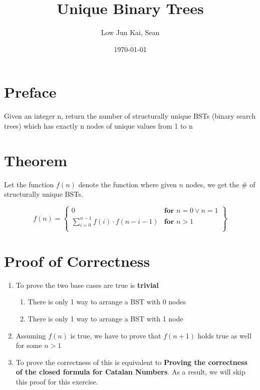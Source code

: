 \documentclass{article}
\title{Unique Binary Trees}
\author{Low Jun Kai, Sean}
\date\today
\begin{document}
\maketitle %

\section*{Preface}

Given an integer n, return the number of structurally unique BSTs (binary search trees) which has exactly n nodes of unique values from 1 to n

\section*{Theorem} 

Let the function $f(n)$ denote the function where given $n$ nodes, we get the \# of structurally unique BSTs. 

\[
    f(n) =
    \left \{
    \begin{array}{lr}
      0 & \textbf{for } n = 0 \lor n = 1 \\
      \sum^{n-1}_{i=0} f(i) \cdot f(n - i -1) & \textbf{for } n > 1 \\ 
    \end{array}
     \right \}
\]

\section*{Proof of Correctness}

\begin{enumerate}

\item To prove the two base cases are true is \textbf{trivial}

\begin{enumerate}

\item There is only 1 way to arrange a BST with 0 nodes

\item There is only 1 way to arrange a BST with 1 node

\end{enumerate}

\item Assuming $f(n)$ is true, we have to prove that $f(n+1)$ holds true as well for some $n > 1$

\item To prove the correctness of this is equivalent to \textbf{Proving the correctness of the closed formula for Catalan Numbers}. As a result, we will skip this proof for this exercise. 

\end{enumerate}
\end{document}
